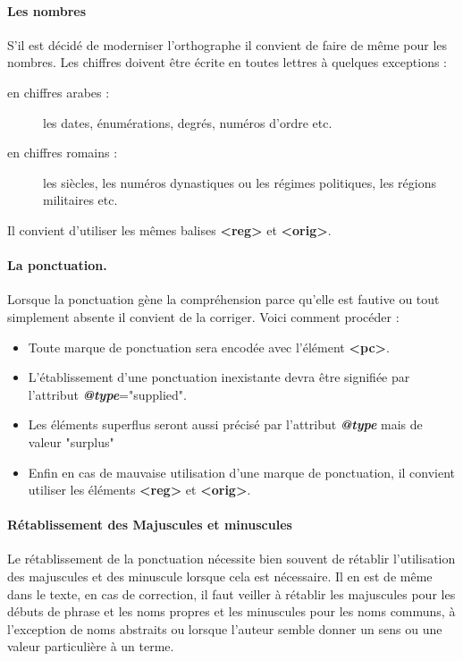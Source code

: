 \documentclass[18pt,a4paper,oneside]{book} %
\begin{document}
\paragraph{Les nombres}

S'il est décidé de moderniser l'orthographe il convient de faire de même pour les nombres. Les chiffres doivent être écrite en toutes lettres à quelques exceptions : 
\begin{description}
\item [en chiffres arabes : ] les dates, énumérations, degrés, numéros d'ordre etc.
\item [en chiffres romains : ] les siècles, les numéros dynastiques ou les régimes politiques, les régions militaires etc.
\end{description}
\bigskip 

Il convient d'utiliser les mêmes balises \textbf{<reg>} et \textbf{<orig>}.

\paragraph{La ponctuation.}

Lorsque la ponctuation gène la compréhension parce qu'elle est fautive ou tout simplement absente il convient de la corriger. Voici comment procéder :
\begin{itemize}
\item Toute marque de ponctuation sera encodée avec l'élément \textbf{<pc>}.
\item L'établissement d'une ponctuation inexistante devra être signifiée par l'attribut \textbf{\textit{@type}}="supplied".
\item Les éléments superflus seront aussi précisé par l'attribut \textbf{\textit{@type}} mais de valeur "surplus"
\item Enfin en cas de mauvaise utilisation d'une marque de ponctuation, il convient utiliser les éléments \textbf{<reg>} et \textbf{<orig>}. 
\end{itemize}

\paragraph{Rétablissement des Majuscules et minuscules}

Le rétablissement de la ponctuation nécessite bien souvent de rétablir l'utilisation des majuscules et des minuscule lorsque cela est nécessaire. Il en est de même dans le texte, en cas de correction, il faut veiller à rétablir les majuscules pour les débuts de phrase et les noms propres et les minuscules pour les noms communs, à l'exception de noms abstraits ou lorsque l'auteur semble donner un sens ou une valeur particulière à un terme.
\end{document}
